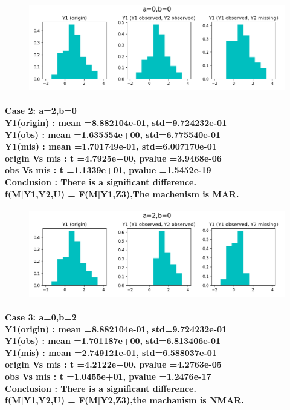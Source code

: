 \documentclass[a4paper]{article}
\newcommand{\yahei}{\CJKfamily{yahei}}
\begin{document}
\begin{figure}[H]
	\centering
	\includegraphics[scale=0.5]{a0b0.png}
	\label{pic1}
\end{figure}

\paragraph{\fontsize{12pt}{16pt}\selectfont\yahei
Case 2: a=2,b=0\\
Y1(origin) : mean =8.882104e-01, std=9.724232e-01\\
Y1(obs) : mean =1.635554e+00, std=6.775540e-01\\
Y1(mis) : mean =1.701749e-01, std=6.007170e-01\\
origin  Vs mis : t =4.7925e+00, pvalue =3.9468e-06\\
obs Vs mis : t =1.1339e+01, pvalue =1.5452e-19\\
Conclusion : There is a significant difference.\\
f(M|Y1,Y2,U) = F(M|Y1,Z3),The machenism is MAR.
}

\begin{figure}[H]
	\centering
	\includegraphics[scale=0.5]{a2b0.png}
	\label{pic2}
\end{figure}

\paragraph{\fontsize{12pt}{16pt}\selectfont\yahei
Case 3: a=0,b=2\\
Y1(origin) : mean =8.882104e-01, std=9.724232e-01\\
Y1(obs) : mean =1.701187e+00, std=6.813406e-01\\
Y1(mis) : mean =2.749121e-01, std=6.588037e-01\\
origin Vs mis : t =4.2122e+00, pvalue =4.2763e-05\\
obs Vs mis : t =1.0455e+01, pvalue =1.2476e-17\\
Conclusion : There is a significant difference.\\
f(M|Y1,Y2,U) = F(M|Y2,Z3),the machanism is NMAR.
}
\end{document}
